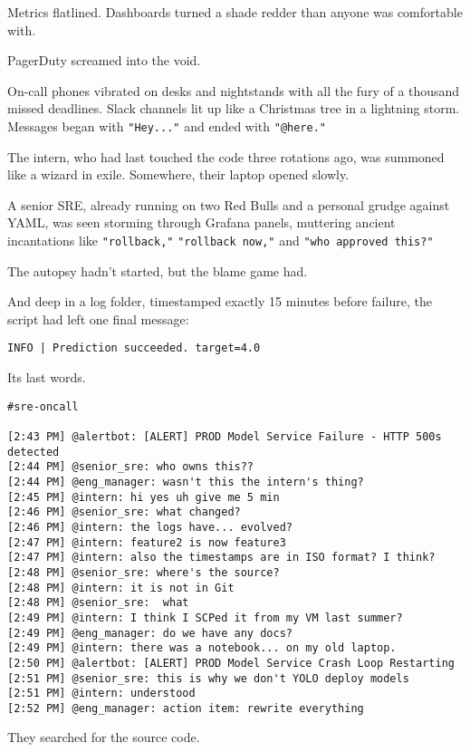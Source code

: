 Metrics flatlined. Dashboards turned a shade redder than anyone was comfortable with.

PagerDuty screamed into the void.

On-call phones vibrated on desks and nightstands with all the fury of a thousand missed deadlines. Slack channels lit up like a Christmas tree in a lightning storm. Messages began with \texttt{"Hey..."} and ended with \texttt{"@here."}

The intern, who had last touched the code three rotations ago, was summoned like a wizard in exile. Somewhere, their laptop opened slowly.

A senior SRE, already running on two Red Bulls and a personal grudge against YAML, was seen storming through Grafana panels, muttering ancient incantations like \texttt{"rollback,"} \texttt{"rollback now,"} and \texttt{"who approved this?"}

The autopsy hadn’t started, but the blame game had.

And deep in a log folder, timestamped exactly 15 minutes before failure, the script had left one final message:

\texttt{INFO | Prediction succeeded. target=4.0}

Its last words.

\begin{lstlisting}[caption={Slack transcript, 2:43 PM on a Friday}, label={lst:slackpanic}, basicstyle=\ttfamily\small, frame=single]
#sre-oncall

[2:43 PM] @alertbot: [ALERT] PROD Model Service Failure - HTTP 500s detected
[2:44 PM] @senior_sre: who owns this??
[2:44 PM] @eng_manager: wasn't this the intern's thing? 
[2:45 PM] @intern: hi yes uh give me 5 min
[2:46 PM] @senior_sre: what changed?
[2:46 PM] @intern: the logs have... evolved?
[2:47 PM] @intern: feature2 is now feature3
[2:47 PM] @intern: also the timestamps are in ISO format? I think?
[2:48 PM] @senior_sre: where's the source? 
[2:48 PM] @intern: it is not in Git
[2:48 PM] @senior_sre:  what
[2:49 PM] @intern: I think I SCPed it from my VM last summer?
[2:49 PM] @eng_manager: do we have any docs?
[2:49 PM] @intern: there was a notebook... on my old laptop.
[2:50 PM] @alertbot: [ALERT] PROD Model Service Crash Loop Restarting 
[2:51 PM] @senior_sre: this is why we don't YOLO deploy models 
[2:51 PM] @intern: understood
[2:52 PM] @eng_manager: action item: rewrite everything
\end{lstlisting}


They searched for the source code.

